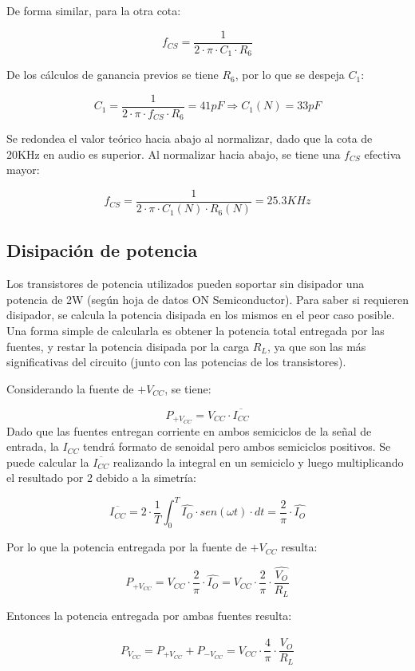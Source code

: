 De forma similar, para la otra cota:

\[
f_{CS} = \frac{1}{2 \cdot \pi \cdot C_1 \cdot R_6}
\]

De los cálculos de ganancia previos se tiene $R_6$, por lo que se despeja $C_1$:

\[
C_1 = \frac{1}{2 \cdot \pi \cdot f_{CS} \cdot R_6} = 41pF \Longrightarrow C_1(N) = 33pF
\]

Se redondea el valor teórico hacia abajo al normalizar, dado que la cota de 20KHz en audio es superior. Al normalizar hacia abajo, se tiene una $f_{CS}$ efectiva mayor:

\[
f_{CS} = \frac{1}{2 \cdot \pi \cdot C_1(N) \cdot R_6(N)} = 25.3KHz
\]

\subsection{Disipación de potencia}

Los transistores de potencia utilizados pueden soportar sin disipador una potencia de 2W (según hoja de datos ON Semiconductor). Para saber si requieren disipador, se calcula la potencia disipada en los mismos en el peor caso posible. Una forma simple de calcularla es obtener la potencia total entregada por las fuentes, y restar la potencia disipada por la carga $R_L$, ya que son las más significativas del circuito (junto con las potencias de los transistores).\par
Considerando la fuente de $+V_{CC}$, se tiene:

\[
P_{+V_{CC}} = V_{CC} \cdot \overline{I_{CC}}
\]
Dado que las fuentes entregan corriente en ambos semiciclos de la señal de entrada, la $I_{CC}$ tendrá formato de senoidal pero ambos semiciclos positivos. Se puede calcular la $\overline{I_{CC}}$ realizando la integral en un semiciclo y luego multiplicando el resultado por 2 debido a la simetría:

\[
\overline{I_{CC}} = 2 \cdot \frac{1}{T} \int_0^T \hat{I_O} \cdot sen(\omega t) \cdot dt = \frac{2}{\pi} \cdot \hat{I_O}
\]

Por lo que la potencia entregada por la fuente de $+V_{CC}$ resulta:

\[
P_{+V_{CC}} = V_{CC} \cdot \frac{2}{\pi} \cdot \hat{I_O} = V_{CC} \cdot \frac{2}{\pi} \cdot \frac{\hat{V_O}}{R_L}
\]

Entonces la potencia entregada por ambas fuentes resulta:

\[
P_{V_{CC}} = P_{+V_{CC}} + P_{-V_{CC}} = V_{CC} \cdot \frac{4}{\pi} \cdot \frac{\hat{V_O}}{R_L}
\]

